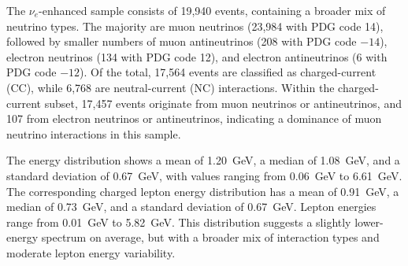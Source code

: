 \documentclass{pracalicmgr}
\begin{document}
The $\nu_e$-enhanced sample consists of 19,940 events, containing a broader mix of neutrino types. The majority are muon neutrinos (23,984 with PDG code 14), followed by smaller numbers of muon antineutrinos (208 with PDG code $-14$), electron neutrinos (134 with PDG code 12), and electron antineutrinos (6 with PDG code $-12$). Of the total, 17,564 events are classified as charged-current (CC), while 6,768 are neutral-current (NC) interactions. Within the charged-current subset, 17,457 events originate from muon neutrinos or antineutrinos, and 107 from electron neutrinos or antineutrinos, indicating a dominance of muon neutrino interactions in this sample.

The energy distribution shows a mean of 1.20~GeV, a median of 1.08~GeV, and a standard deviation of 0.67~GeV, with values ranging from 0.06~GeV to 6.61~GeV. The corresponding charged lepton energy distribution has a mean of 0.91~GeV, a median of 0.73~GeV, and a standard deviation of 0.67~GeV. Lepton energies range from 0.01~GeV to 5.82~GeV. This distribution suggests a slightly lower-energy spectrum on average, but with a broader mix of interaction types and moderate lepton energy variability.
\end{document}
